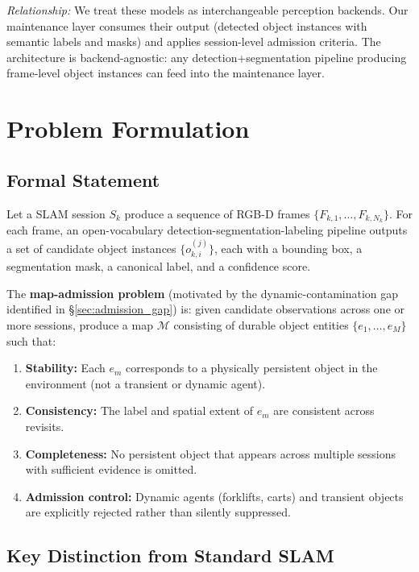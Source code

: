 \documentclass[journal]{IEEEtran}
\begin{document}
\textit{Relationship:} We treat these models as interchangeable perception backends. Our maintenance layer consumes their output (detected object instances with semantic labels and masks) and applies session-level admission criteria. The architecture is backend-agnostic: any detection+segmentation pipeline producing frame-level object instances can feed into the maintenance layer.

\section{Problem Formulation}
\label{sec:problem}

\subsection{Formal Statement}
\label{sec:problem_formal}

Let a SLAM session $S_k$ produce a sequence of RGB-D frames $\{F_{k,1}, \ldots, F_{k,N_k}\}$. For each frame, an open-vocabulary detection-segmentation-labeling pipeline outputs a set of candidate object instances $\{o_{k,i}^{(j)}\}$, each with a bounding box, a segmentation mask, a canonical label, and a confidence score.

The \textbf{map-admission problem} (motivated by the dynamic-contamination gap identified in \S\ref{sec:admission_gap}) is: given candidate observations across one or more sessions, produce a map $\mathcal{M}$ consisting of durable object entities $\{e_1, \ldots, e_M\}$ such that:
\begin{enumerate}
  \item \textbf{Stability:} Each $e_m$ corresponds to a physically persistent object in the environment (not a transient or dynamic agent).
  \item \textbf{Consistency:} The label and spatial extent of $e_m$ are consistent across revisits.
  \item \textbf{Completeness:} No persistent object that appears across multiple sessions with sufficient evidence is omitted.
  \item \textbf{Admission control:} Dynamic agents (forklifts, carts) and transient objects are explicitly rejected rather than silently suppressed.
\end{enumerate}

\subsection{Key Distinction from Standard SLAM}
\label{sec:problem_distinction}
\end{document}
